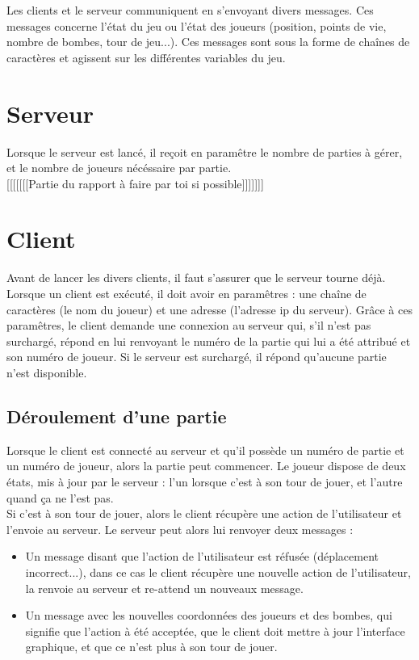 	Les clients et le serveur communiquent en s'envoyant divers messages. Ces messages concerne l'état du jeu ou l'état des joueurs (position, points de vie, nombre de bombes, tour de jeu...). Ces messages sont sous la forme de chaînes de caractères et agissent sur les différentes variables du jeu.

\section*{Serveur}

Lorsque le serveur est lancé, il reçoit en paramêtre le nombre de parties à gérer, et le nombre de joueurs nécéssaire par partie. \\

[[[[[[[Partie du rapport à faire par toi si possible]]]]]]]

\section*{Client}

Avant de lancer les divers clients, il faut s'assurer que le serveur tourne déjà. Lorsque un client est exécuté, il doit avoir en paramêtres : une chaîne de caractères (le nom du joueur) et une adresse (l'adresse ip du serveur). Grâce à ces paramêtres, le client demande une connexion au serveur qui, s'il n'est pas surchargé, répond en lui renvoyant le numéro de la partie qui lui a été attribué et son numéro de joueur. Si le serveur est surchargé, il répond qu'aucune partie n'est disponible.

\subsection*{Déroulement d'une partie}

Lorsque le client est connecté au serveur et qu'il possède un numéro de partie et un numéro de joueur, alors la partie peut commencer. Le joueur dispose de deux états, mis à jour par le serveur : l'un lorsque c'est à son tour de jouer, et l'autre quand ça ne l'est pas.\\ 

Si c'est à son tour de jouer, alors le client récupère une action de l'utilisateur et l'envoie au serveur. Le serveur peut alors lui renvoyer deux messages :
\begin{itemize}
	\item Un message disant que l'action de l'utilisateur est réfusée (déplacement incorrect...), dans ce cas le client récupère une nouvelle action de l'utilisateur, la renvoie au serveur et re-attend un nouveaux message.
	\item Un message avec les nouvelles coordonnées des joueurs et des bombes, qui signifie que l'action à été acceptée, que le client doit mettre à jour l'interface graphique, et que ce n'est plus à son tour de jouer.
\end{itemize}


